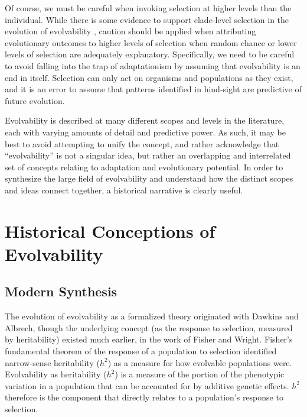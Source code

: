 \documentclass[PhD]{msu-thesis}
\begin{document}
Of course, we must be careful when invoking selection at higher levels than the individual. While there is some evidence to support clade-level selection in the evolution of evolvability \cite{okasha_evolution_2006}, caution should be applied when attributing evolutionary outcomes to higher levels of selection when random chance or lower levels of selection are adequately explanatory. Specifically, we need to be careful to avoid falling into the trap of adaptationism\cite{gould_spandrels_1979} by assuming that evolvability is an end in itself. Selection can only act on organisms and populations as they exist, and it is an error to assume that patterns identified in hind-sight are predictive of future evolution.

Evolvability is described at many different scopes and levels in the literature, each with varying amounts of detail and predictive power. As such, it may be best to avoid attempting to unify the concept, and rather acknowledge that “evolvability” is not a singular idea, but rather an overlapping and interrelated set of concepts relating to adaptation and evolutionary potential. In order to synthesize the large field of evolvability and understand how the distinct scopes and ideas connect together, a historical narrative is clearly useful.

\section{Historical Conceptions of Evolvability}
\subsection{Modern Synthesis}

The evolution of evolvability as a formalized theory originated with Dawkins\cite{dawkins_13_2003} and \\Albrech\cite{alberch_genes_1991}, though the underlying concept (as the response to selection, measured by heritability) existed much earlier, in the work of Fisher\cite{fisher_genetical_1930} and Wright\cite{wright_evolution_1931}. Fisher’s fundamental theorem of the response of a population to selection identified narrow-sense heritability ($h^2$) as a measure for how evolvable populations were. Evolvability as heritability ($h^2$) is a measure of the portion of the phenotypic variation in a population that can be accounted for by additive genetic effects. $h^2$ therefore is the component that directly relates to a population’s response to selection\cite{houle_comparing_1992}.
\end{document}
